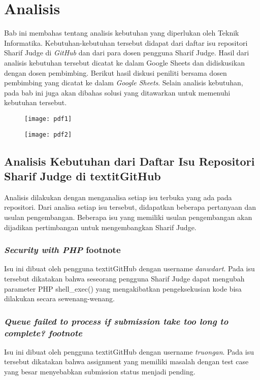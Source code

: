 \chapter{Analisis}
\label{chap:analisis}

Bab ini membahas tentang analisis kebutuhan yang diperlukan oleh Teknik Informatika. Kebutuhan-kebutuhan tersebut didapat dari daftar isu repositori Sharif Judge di \textit{GitHub} dan dari para dosen pengguna Sharif Judge. Hasil dari analisis kebutuhan tersebut dicatat ke dalam Google Sheets dan didiskusikan dengan dosen pembimbing. Berikut hasil diskusi peniliti bersama dosen pembimbing yang dicatat ke dalam \textit{Google Sheets}. Selain analisis kebutuhan, pada bab ini juga akan dibahas solusi yang ditawarkan untuk memenuhi kebutuhan tersebut.

\begin{figure}[H]
	\centering  
	\texttt{[image: pdf1]}
	
	\texttt{[image: pdf2]}
\end{figure}

\section{Analisis Kebutuhan dari Daftar Isu Repositori Sharif Judge di textit{GitHub}}
\label{sec:analisisgithub} 
Analisis dilakukan dengan menganalisa setiap isu terbuka yang ada pada repositori. Dari analisa setiap isu tersebut, didapatkan beberapa pertanyaan dan usulan pengembangan. Beberapa isu yang memiliki usulan pengembangan akan dijadikan pertimbangan untuk mengembangkan Sharif Judge.

\subsection{\textit{Security with PHP} footnote}
Isu ini dibuat oleh pengguna textit{GitHub} dengan username \textit{danwdart}. Pada isu tersebut dikatakan bahwa seseorang pengguna Sharif Judge dapat mengubah parameter PHP shell\_exec() yang mengakibatkan pengeksekusian kode bisa dilakukan secara sewenang-wenang. %
	
\subsection{\textit{Queue failed to process if submission take too long to complete? footnote}}
Isu ini dibuat oleh pengguna textit{GitHub} dengan username \textit{truongan}. Pada isu tersebut dikatakan bahwa assignment yang memiliki masalah dengan test case yang besar menyebabkan submission status menjadi pending. %

